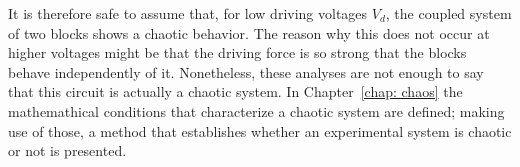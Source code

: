 It is therefore safe to assume that, for low driving voltages $V_d$, the coupled system of two blocks shows a chaotic behavior.
The reason why this does not occur at higher voltages might be that the driving force is so strong that the blocks
behave independently of it. Nonetheless, these analyses are not enough to say that this circuit is actually a chaotic system.
In Chapter~\ref{chap: chaos} the mathemathical conditions that characterize
a chaotic system are defined; making use of those, a method that establishes whether an experimental
system is chaotic or not is presented.



